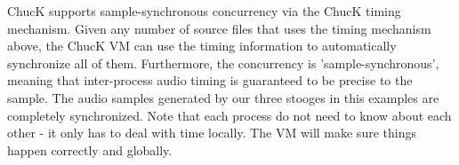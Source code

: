 ChucK supports sample-synchronous concurrency via the ChucK timing mechanism. Given any 
number of source files that uses the timing mechanism above, the ChucK VM can use the timing 
information to automatically synchronize all of them. Furthermore, the concurrency is 
'sample-synchronous', meaning that inter-process audio timing is guaranteed to be precise to 
the sample. The audio samples generated by our three stooges in this examples are completely 
synchronized. Note that each process do not need to know about each other - it only has to deal 
with time locally. The VM will make sure things happen correctly and globally. 
